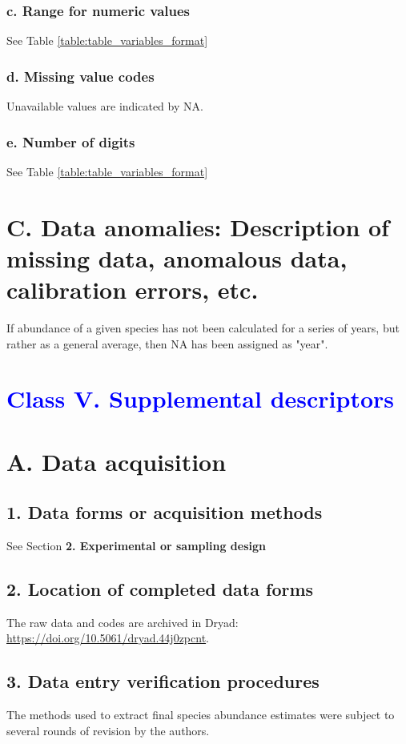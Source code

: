 \documentclass[a4paper,twoside,12pt]{article}
\begin{document}
                    \subsubsection*{c. Range for numeric values} See Table \ref{table:table_variables_format}
                    \subsubsection*{d. Missing value codes} Unavailable values are indicated by NA.
                    \subsubsection*{e. Number of digits} See Table \ref{table:table_variables_format}
            \newpage
            
           
			\newpage
        
 \section*{C. Data anomalies: Description of missing data, anomalous data, calibration errors, etc.}
  If abundance of a given species has not been calculated for a series of years, but rather as a general average, then NA has been assigned as "year".
 
 \section*{\textcolor{Blue}{Class V. Supplemental descriptors}}
    \section*{A. Data acquisition}
    		\subsection*{1. Data forms or acquisition methods}
   		See Section \textbf{2. Experimental or sampling design} 
   		\subsection*{2. Location of completed data forms}
        The raw data and codes are archived in Dryad: \url{https://doi.org/10.5061/dryad.44j0zpcnt}.
        \subsection*{3. Data entry verification procedures}
       	The methods used to extract final species abundance estimates were subject to several rounds of revision by the authors.
       	
\end{document}
